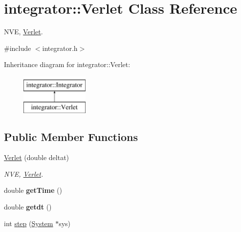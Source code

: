 \hypertarget{classintegrator_1_1Verlet}{\section{integrator\-:\-:Verlet Class Reference}
\label{classintegrator_1_1Verlet}
}


N\-V\-E, \hyperlink{classintegrator_1_1Verlet}{Verlet}.  




{\ttfamily \#include $<$integrator.\-h$>$}

Inheritance diagram for integrator\-:\-:Verlet\-:\begin{figure}[H]
\begin{center}
\leavevmode
\includegraphics[height=2.000000cm]{classintegrator_1_1Verlet}
\end{center}
\end{figure}
\subsection*{Public Member Functions}
\begin{DoxyCompactItemize}
\item 
\hypertarget{classintegrator_1_1Verlet_a30340cd5a1eab3aed2266523e9ac6887}{\hyperlink{classintegrator_1_1Verlet_a30340cd5a1eab3aed2266523e9ac6887}{Verlet} (double deltat)}\label{classintegrator_1_1Verlet_a30340cd5a1eab3aed2266523e9ac6887}

\begin{DoxyCompactList}\small\item\em N\-V\-E, \hyperlink{classintegrator_1_1Verlet}{Verlet}. \end{DoxyCompactList}\item 
\hypertarget{classintegrator_1_1Verlet_aaf0739070361925c4353ae54873f2d2e}{double {\bfseries get\-Time} ()}\label{classintegrator_1_1Verlet_aaf0739070361925c4353ae54873f2d2e}

\item 
\hypertarget{classintegrator_1_1Verlet_afe8dfd71c2a1aa0b45eee4e242fad791}{double {\bfseries getdt} ()}\label{classintegrator_1_1Verlet_afe8dfd71c2a1aa0b45eee4e242fad791}

\item 
int \hyperlink{classintegrator_1_1Verlet_a24796d8665c8bc58867e13ec11d5cdbe}{step} (\hyperlink{classsim__system_1_1System}{System} $\ast$sys)
\end{DoxyCompactItemize}

